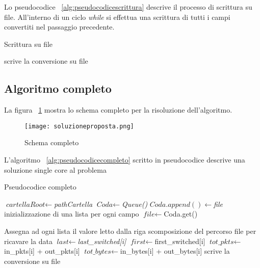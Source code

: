 \documentclass[../main.tex]{subfiles}
\begin{document}
Lo pseudocodice ~\ref{alg:pseudocodicescrittura} descrive il processo di scrittura su file. All'interno di un ciclo \textit{while} si effettua una scrittura di tutti i campi convertiti nel passaggio precedente.
\begin{algorithm}[H]
				\caption{Scrittura su file}
				\label{alg:pseudocodicescrittura}
\begin{algorithmic}[1]
				\State scrive la conversione su file
				\EndWhile
\end{algorithmic}
\end{algorithm}

\subsection{Algoritmo completo}
La figura ~\ref{fig:soluzioneproposta} mostra lo schema completo per la risoluzione dell'algoritmo.
\begin{figure}[H]
				\centering
\texttt{[image: soluzioneproposta.png]}
				\caption{Schema completo}
				\label{fig:soluzioneproposta}
\end{figure}

L'algoritmo ~\ref{alg:pseudocodicecompleto} scritto in pseudocodice descrive una soluzione single core al problema

\begin{algorithm}[H]
\begin{algorithmic}[1]
				\caption{Pseudocodice completo}
				\label{alg:pseudocodicecompleto}
				\State $\textit{cartellaRoot} \gets $\textit{pathCartella}
				\State $\textit{Coda} \gets $\textit{Queue()} 
						\State $\textit{Coda}.append() \gets $\textit{file} 
						\EndFor
				\EndFor
				\State inizializzazione di una lista per ogni campo
				\State $\textit{file} \gets $Coda.get() 

						\State Assegna ad ogni lista il valore letto dalla riga
				\EndFor
				\State scomposizione del percorso file per ricavare la data
				\State $\textit{last} \gets $\textit{last\_switched[i]} 
				\State $\textit{first} \gets $first\_switched[i]
				\State $\textit{tot\_pkts} \gets $in\_pkts[i] + out\_pkts[i]
				\State $\textit{tot\_bytes} \gets $in\_bytes[i] + out\_bytes[i]
				\EndWhile
				\State scrive la conversione su file
				\EndWhile
				
\end{algorithmic}
\end{algorithm}
\end{document}
